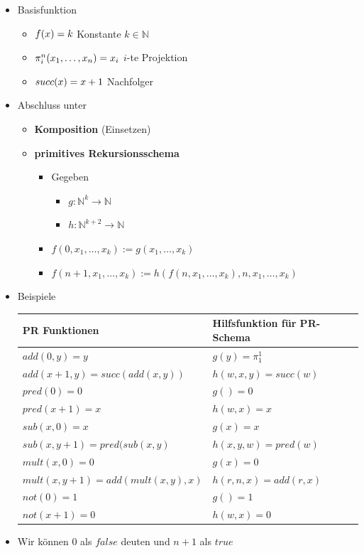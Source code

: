 \documentclass{scrartcl}
\begin{document}
\begin{itemize}
	\item Basisfunktion
	\begin{itemize}
		\item $f(x) = k \hfill$ Konstante $k \in \mathbb{N}$
		\item $\pi_i^n(x_1,\ldots,x_n) = x_i \hfill$ $i$-te Projektion
		\item $succ(x) = x+1 \hfill$ Nachfolger
	\end{itemize}
	\item Abschluss unter
	\begin{itemize}
		\item \textbf{Komposition} (Einsetzen)
		\item \textbf{primitives Rekursionsschema}
		\begin{itemize}
			\item Gegeben
			\begin{itemize}
				\item $g: \mathbb{N}^k \rightarrow \mathbb{N}$
				\item $h: \mathbb{N}^{k+2} \rightarrow \mathbb{N}$
			\end{itemize}
			\item $f(0,x_1,\ldots,x_k) := g(x_1,\ldots,x_k)$
			\item $f(n+1,x_1,\ldots,x_k) := h(f(n,x_1,\ldots,x_k),n,x_1,\ldots,x_k)$
		\end{itemize}
	\end{itemize}
	\item Beispiele \\
	\renewcommand{\arraystretch}{1.2}
	\begin{tabular}{|l|l|}
	\hline 
	PR Funktionen & Hilfsfunktion für PR-Schema \\ 
	\hline 
	$add(0,y) = y$ & $g(y) = \pi_1^1$ \\ 
	\hline 
	$add(x+1,y) = succ(add(x,y))$ & $h(w,x,y) = succ(w)$ \\ 
	\hline 
	$pred(0) = 0$ & $g() = 0$ \\ 
	\hline 
	$pred(x+1) = x$ & $h(w,x) = x$ \\ 
	\hline 
	$sub(x,0) = x$ & $g(x) = x$ \\ 
	\hline 
	$sub(x,y+1) = pred(sub(x,y)$ & $h(x,y,w) = pred(w)$ \\ 
	\hline 
	$mult(x,0) = 0$ & $g(x) = 0$ \\ 
	\hline 
	$mult(x,y+1) = add(mult(x,y),x)$ & $h(r,n,x) = add(r,x)$ \\ 
	\hline 
	$not(0) = 1$ & $g() = 1$ \\ 
	\hline 
	$not(x+1) = 0$ & $h(w,x) = 0$ \\ 
	\hline 
	\end{tabular}
	\item Wir können 0 als $false$ deuten und $n+1$ als $true$
\end{itemize}
\end{document}

